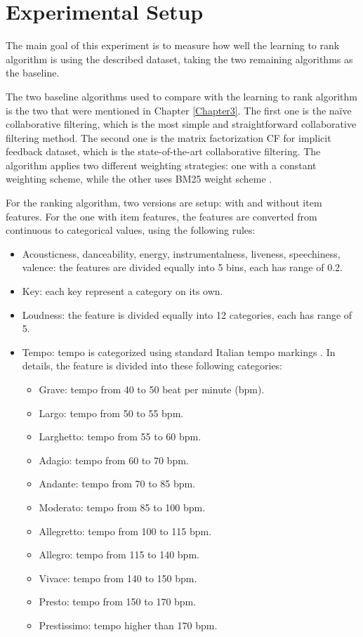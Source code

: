 \section{Experimental Setup}
The main goal of this experiment is to measure how well the learning to rank algorithm is using the described dataset, taking the two remaining algorithms as the baseline. 

\noindent The two baseline algorithms used to compare with the learning to rank algorithm is the two that were mentioned in Chapter \ref{Chapter3}. The first one is the na\"ive collaborative filtering, which is the most simple and straightforward collaborative filtering method. The second one is the matrix factorization CF for implicit feedback dataset, which is the state-of-the-art collaborative filtering. The algorithm applies two different weighting strategies: one with a constant weighting scheme, while the other uses BM25 weight scheme \cite{singhal2001modern}.

\noindent For the ranking algorithm, two versions are setup: with and without item features. For the one with item features, the features are converted from continuous to categorical values, using the following rules:

\begin{itemize}
	\item Acousticness, danceability, energy, instrumentalness, liveness, speechiness, valence: the features are divided equally into 5 bins, each has range of 0.2.
	\item Key: each key represent a category on its own.
	\item Loudness: the feature is divided equally into 12 categories, each has range of 5.
	\item Tempo: tempo is categorized using standard Italian tempo markings \cite{2018Tempo}. In details, the feature is divided into these following categories:
	\begin{itemize}
		\item Grave: tempo from 40 to 50 beat per minute (bpm).
		\item Largo: tempo from 50 to 55 bpm.
		\item Larghetto: tempo from 55 to 60 bpm.
		\item Adagio: tempo from 60 to 70 bpm.
		\item Andante: tempo from 70 to 85 bpm.
		\item Moderato: tempo from 85 to 100 bpm.
		\item Allegretto: tempo from 100 to 115 bpm.
		\item Allegro: tempo from 115 to 140 bpm.
		\item Vivace: tempo from 140 to 150 bpm.
		\item Presto: tempo from 150 to 170 bpm.
		\item Prestissimo: tempo higher than 170 bpm.
\end{itemize}	  
\end{itemize}

